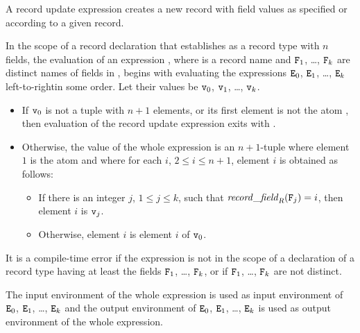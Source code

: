 \label{section:record-update}
A record update expression creates a new record with field values as specified
or according to a given record.

\EVALUATION

In the scope of a record declaration that establishes  as
a record type with $n$ fields, the evaluation of an expression
,
where  is a record name and ${\tt{\sl F}}_1$, \ldots, ${\tt{\sl F}}_k$ are
distinct names of fields in , begins with
evaluating the expressions ${\tt{\sl E}}_0$, ${\tt{\sl E}}_1$, \ldots,
${\tt{\sl E}}_k$ \ifStd left-to-right\fi \ifOld in some order\fi.  Let their values be
${\tt{\sl v}}_0$, ${\tt{\sl v}}_1$, \ldots, ${\tt{\sl v}}_k$.
\begin{itemize}
\item If ${\tt{\sl v}}_0$ is not a tuple with $n+1$ elements, or its first element is
not the atom , then evaluation of the record update expression exits
with .
\item Otherwise, the value of the whole expression is
an $n+1$-tuple where element $1$ is the atom  and
where for each $i$, $2\leq i\leq n+1$,
element $i$ is obtained as follows:
\begin{itemize}
\item If there is an integer
$j$, $1\leq j\leq k$, such that $\mathit{record\_field}_{\mbox{\scriptsize\tt{\sl{R}}}}({\tt{\sl F}}_j)=i$,
then element $i$ is ${\tt{\sl v}}_j$.
\item Otherwise, element $i$ is element $i$ of ${\tt{\sl v}}_0$.
\end{itemize}
\end{itemize}
It is a compile-time error if the expression is not in the scope of
a declaration of a record type  having at least the fields
${\tt{\sl F}}_1$, \ldots, ${\tt{\sl F}}_k$, or if ${\tt{\sl F}}_1$, \ldots, ${\tt{\sl F}}_k$
are not distinct.

\ENVIRONMENTS

The input environment of the whole expression is used as input environment
of ${\tt{\sl E}}_0$, ${\tt{\sl E}}_1$, \ldots, ${\tt{\sl E}}_k$ and the output environment of
${\tt{\sl E}}_0$, ${\tt{\sl E}}_1$, \ldots, ${\tt{\sl E}}_k$ is used as output environment of the
whole expression.

\NOTE

